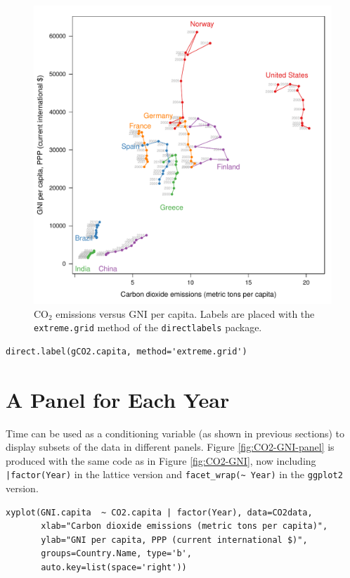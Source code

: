 \documentclass[smallroyalvopaper]{memoir}
\begin{document}
\begin{figure}[htb]
\centering
\includegraphics[width=.9\linewidth]{figs/CO2_capitaDL.pdf}
\caption{\label{fig:CO2-GNI-DL}$\mathrm{CO_2}$ emissions versus GNI per capita. Labels are placed with the \texttt{extreme.grid} method of the \texttt{directlabels} package.}
\end{figure}

\lstset{language=R,numbers=none}
\begin{lstlisting}
direct.label(gCO2.capita, method='extreme.grid')
\end{lstlisting}
\section{A Panel for Each Year}
\label{sec-5}
Time can be used as a conditioning variable (as shown in previous
sections) to display subsets of the data in different panels. Figure
\ref{fig:CO2-GNI-panel} is produced with the same code as in Figure
\ref{fig:CO2-GNI}, now including \texttt{|factor(Year)} in the lattice
version and \texttt{facet\_wrap(\textasciitilde{} Year)} in the \texttt{ggplot2} version.

\lstset{language=R,numbers=none}
\begin{lstlisting}
xyplot(GNI.capita  ~ CO2.capita | factor(Year), data=CO2data,
       xlab="Carbon dioxide emissions (metric tons per capita)",
       ylab="GNI per capita, PPP (current international $)",
       groups=Country.Name, type='b',
       auto.key=list(space='right'))
\end{lstlisting}
\end{document}
